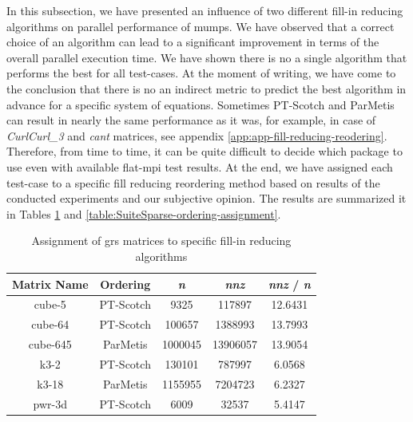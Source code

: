 In this subsection, we have presented an influence of  two different fill-in reducing algorithms on parallel performance of \acrshort{mumps}. We have observed that a correct choice of an algorithm can lead to a significant improvement in terms of the overall parallel execution time. We have shown there is no a single algorithm that performs the best for all test-cases. At the moment of writing, we have come to the conclusion that there is no an indirect metric to predict the best algorithm in advance for a specific system of equations. Sometimes PT-Scotch and ParMetis can result in nearly the same performance as it was, for example, in case of \textit{CurlCurl\_3} and \textit{cant} matrices, see appendix \ref{app:app-fill-reducing-reodering}. Therefore, from time to time, it can be quite difficult to decide which package to use even with available flat-\acrshort{mpi} test results. At the end, we have assigned each test-case to a specific fill reducing reordering method based on results of the conducted experiments and our subjective opinion. The results are summarized it in Tables \ref{table:GRS-ordering-assignment} and \ref{table:SuiteSparse-ordering-assignment}. \\ 


\begin{table}[!h]
\centering
\begin{tabular}{|c|c|c|c|c|}
\hline
Matrix Name & Ordering  & \textit{n}       & \textit{nnz}      & \textit{nnz} / \textit{n} \\ \hline
cube-5      & PT-Scotch & 9325    & 117897   & 12.6431 \\ \hline
cube-64     & PT-Scotch & 100657  & 1388993  & 13.7993 \\ \hline
cube-645    & ParMetis  & 1000045 & 13906057 & 13.9054 \\ \hline
k3-2        & PT-Scotch & 130101  & 787997   & 6.0568  \\ \hline
k3-18       & ParMetis  & 1155955 & 7204723  & 6.2327  \\ \hline
pwr-3d      & PT-Scotch & 6009    & 32537    & 5.4147  \\ \hline
\end{tabular}
\caption{Assignment of \acrshort{grs} matrices to specific fill-in reducing algorithms}
\label{table:GRS-ordering-assignment}
\end{table}


